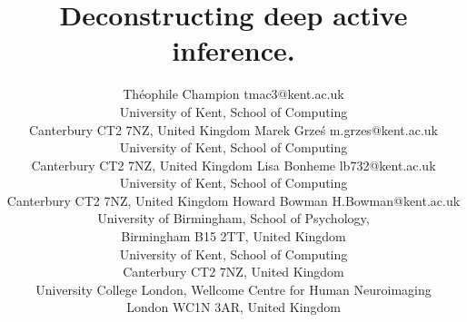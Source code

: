 \documentclass[twoside,11pt]{article}
\begin{document}
\title{Deconstructing deep active inference.}

\author{\name Théophile Champion \email tmac3@kent.ac.uk \\
       \addr University of Kent, School of Computing\\
       Canterbury CT2 7NZ, United Kingdom
       \AND
       \name Marek Grze\'s \email m.grzes@kent.ac.uk \\
       \addr University of Kent, School of Computing\\
       Canterbury CT2 7NZ, United Kingdom
       \AND
       \name Lisa Bonheme \email lb732@kent.ac.uk \\
       \addr University of Kent, School of Computing\\
       Canterbury CT2 7NZ, United Kingdom
       \AND
       \name Howard Bowman \email H.Bowman@kent.ac.uk \\
       \addr University of Birmingham, School of Psychology,\\
       Birmingham B15 2TT, United Kingdom\\
       University of Kent, School of Computing\\
       Canterbury CT2 7NZ, United Kingdom\\
       University College London, Wellcome Centre for Human Neuroimaging\\
       London WC1N 3AR, United Kingdom
       }
       

\maketitle
\end{document}
